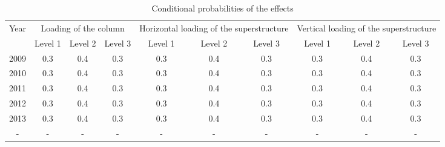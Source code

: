 \begin{table}
	\centering
	\caption{Conditional probabilities of the effects} \label{tbleventfault:2}
\begin{tabular}{|l|l|l|l|l|l|l|l|l|l|}
\hline
\multicolumn{1}{|c|}{Year} & \multicolumn{3}{c|}{Loading of the column} & \multicolumn{3}{m{2.5cm}|}{\centering Horizontal loading of the superstructure} & \multicolumn{3}{m{2.5cm}|}{\centering Vertical loading of the superstructure} \\ 
\cline{2-10}
\multicolumn{1}{|c|}{} & \multicolumn{1}{c|}{Level 1} & \multicolumn{1}{c|}{Level 2} & \multicolumn{1}{c|}{Level 3} & \multicolumn{1}{c|}{Level 1} & \multicolumn{1}{c|}{Level 2} & \multicolumn{1}{c|}{Level 3} & \multicolumn{1}{c|}{Level 1} & \multicolumn{1}{c|}{Level 2} & \multicolumn{1}{c|}{Level 3} \\ 
\hline
\multicolumn{1}{|c|}{2009} & \multicolumn{1}{c|}{0.3} & \multicolumn{1}{c|}{0.4} & \multicolumn{1}{c|}{0.3} & \multicolumn{1}{c|}{0.3} & \multicolumn{1}{c|}{0.4} & \multicolumn{1}{c|}{0.3} & \multicolumn{1}{c|}{0.3} & \multicolumn{1}{c|}{0.4} & \multicolumn{1}{c|}{0.3} \\ 
\hline
\multicolumn{1}{|c|}{2010} & \multicolumn{1}{c|}{0.3} & \multicolumn{1}{c|}{0.4} & \multicolumn{1}{c|}{0.3} & \multicolumn{1}{c|}{0.3} & \multicolumn{1}{c|}{0.4} & \multicolumn{1}{c|}{0.3} & \multicolumn{1}{c|}{0.3} & \multicolumn{1}{c|}{0.4} & \multicolumn{1}{c|}{0.3} \\ 
\hline
\multicolumn{1}{|c|}{2011} & \multicolumn{1}{c|}{0.3} & \multicolumn{1}{c|}{0.4} & \multicolumn{1}{c|}{0.3} & \multicolumn{1}{c|}{0.3} & \multicolumn{1}{c|}{0.4} & \multicolumn{1}{c|}{0.3} & \multicolumn{1}{c|}{0.3} & \multicolumn{1}{c|}{0.4} & \multicolumn{1}{c|}{0.3} \\ 
\hline
\multicolumn{1}{|c|}{2012} & \multicolumn{1}{c|}{0.3} & \multicolumn{1}{c|}{0.4} & \multicolumn{1}{c|}{0.3} & \multicolumn{1}{c|}{0.3} & \multicolumn{1}{c|}{0.4} & \multicolumn{1}{c|}{0.3} & \multicolumn{1}{c|}{0.3} & \multicolumn{1}{c|}{0.4} & \multicolumn{1}{c|}{0.3} \\ 
\hline
\multicolumn{1}{|c|}{2013} & \multicolumn{1}{c|}{0.3} & \multicolumn{1}{c|}{0.4} & \multicolumn{1}{c|}{0.3} & \multicolumn{1}{c|}{0.3} & \multicolumn{1}{c|}{0.4} & \multicolumn{1}{c|}{0.3} & \multicolumn{1}{c|}{0.3} & \multicolumn{1}{c|}{0.4} & \multicolumn{1}{c|}{0.3} \\ 
\hline
\multicolumn{1}{|c}{-} & \multicolumn{1}{c}{-} & \multicolumn{1}{c}{-} & \multicolumn{1}{c}{-} & \multicolumn{1}{c}{-} & \multicolumn{1}{c}{-} & \multicolumn{1}{c}{-} & \multicolumn{1}{c}{-} & \multicolumn{1}{c}{-} & \multicolumn{1}{c|}{-} \\ 

\end{tabular}
\end{table}
